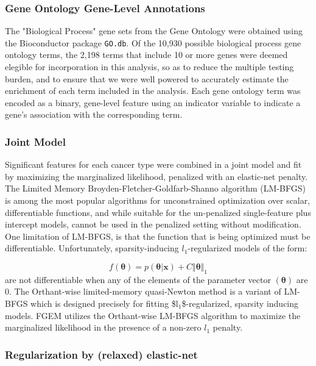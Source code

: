 \subsubsection{Gene Ontology Gene-Level Annotations}\label{sec:orgd117550}

The "Biological Process" gene sets from the Gene Ontology were obtained using the Bioconductor package \texttt{GO.db}\cite{godb}. Of the 10,930 possible biological process gene ontology terms, the 2,198 terms that 
include 10 or more genes were deemed elegible for incorporation in this analysis, so as to reduce the multiple testing burden, and to ensure that we were well powered to accurately estimate the enrichment of each term included in the analysis.  Each gene ontology term was encoded as a binary, gene-level feature using an indicator variable to indicate a gene's association with the corresponding term. 

\subsubsection{Joint Model}\label{sec:orga62a234}

Significant features for each cancer type were combined in a joint model and fit by maximizing the marginalized likelihood, penalized with an elastic-net penalty.  The Limited Memory Broyden-Fletcher-Goldfarb-Shanno algorithm (LM-BFGS)\cite{LMBFGS} is among the most popular algorithms
for unconstrained optimization over scalar, differentiable functions, and while suitable for the un-penalized single-feature plus intercept models, cannot be used in the penalized setting without modification.  One limitation of LM-BFGS, is that the function that is being optimized must be differentiable.  Unfortunately, sparsity-inducing $l_{\text{1}}$-regularized models of the form:

$$f(\boldsymbol{\theta})=p(\boldsymbol{\theta} | \textbf{x}) + C \Vert \boldsymbol{\theta} \Vert_1$$ are not differentiable when any of the elements of the parameter vector $(\boldsymbol{\theta})$ are 0.  The Orthant-wise limited-memory quasi-Newton method is a variant of LM-BFGS which is designed precisely for fitting \$l\(_{\text{1}}\)\$-regularized, sparsity inducing models.  FGEM utilizes the Orthant-wise LM-BFGS algorithm to maximize the marginalized likelihood in the presence of a non-zero $l_{\text{1}}$ penalty.
 
\subsubsection{Regularization by (relaxed) elastic-net}\label{sec:orge3a8031}

